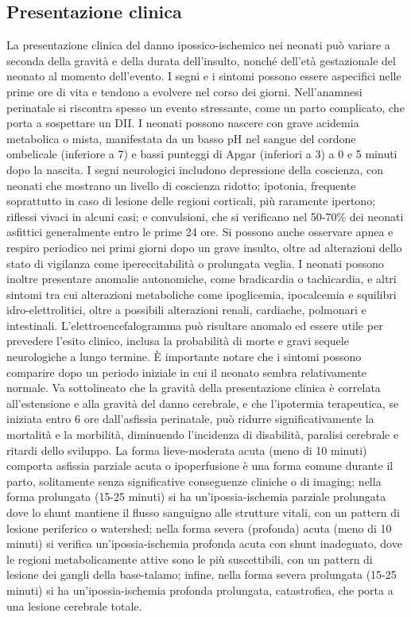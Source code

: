 \subsection{Presentazione clinica}
La presentazione clinica del danno ipossico-ischemico nei neonati può variare a seconda della gravità e della durata dell'insulto, nonché dell'età gestazionale del neonato al momento dell'evento. I segni e i sintomi possono essere aspecifici nelle prime ore di vita e tendono a evolvere nel corso dei giorni.
Nell'anamnesi perinatale si riscontra spesso un evento stressante, come un parto complicato, che porta a sospettare un DII. I neonati possono nascere con grave acidemia metabolica o mista, manifestata da un basso pH nel sangue del cordone ombelicale (inferiore a 7) e bassi punteggi di Apgar (inferiori a 3) a 0 e 5 minuti dopo la nascita. I segni neurologici includono depressione della coscienza, con neonati che mostrano un livello di coscienza ridotto; ipotonia, frequente soprattutto in caso di lesione delle regioni corticali, più raramente ipertono; riflessi vivaci in alcuni casi; e convulsioni, che si verificano nel 50-70\% dei neonati asfittici generalmente entro le prime 24 ore. Si possono anche osservare apnea e respiro periodico nei primi giorni dopo un grave insulto, oltre ad alterazioni dello stato di vigilanza come ipereccitabilità o prolungata veglia. 
I neonati possono inoltre presentare anomalie autonomiche, come bradicardia o tachicardia, e altri sintomi tra cui alterazioni metaboliche come ipoglicemia, ipocalcemia e squilibri idro-elettrolitici, oltre a possibili alterazioni renali, cardiache, polmonari e intestinali. L'elettroencefalogramma può risultare anomalo ed essere utile per prevedere l'esito clinico, inclusa la probabilità di morte e gravi sequele neurologiche a lungo termine. È importante notare che i sintomi possono comparire dopo un periodo iniziale in cui il neonato sembra relativamente normale. 
Va sottolineato che la gravità della presentazione clinica è correlata all'estensione e alla gravità del danno cerebrale, e che l'ipotermia terapeutica, se iniziata entro 6 ore dall'asfissia perinatale, può ridurre significativamente la mortalità e la morbilità, diminuendo l'incidenza di disabilità, paralisi cerebrale e ritardi dello sviluppo.
La forma lieve-moderata acuta (meno di 10 minuti) comporta asfissia parziale acuta o ipoperfusione è una forma comune durante il parto, solitamente senza significative conseguenze cliniche o di imaging; nella forma prolungata (15-25 minuti) si ha un'ipossia-ischemia parziale prolungata dove lo shunt mantiene il flusso sanguigno alle strutture vitali, con un pattern di lesione periferico o watershed; nella forma severa (profonda) acuta (meno di 10 minuti) si verifica un'ipossia-ischemia profonda acuta con shunt inadeguato, dove le regioni metabolicamente attive sono le più suscettibili, con un pattern di lesione dei gangli della base-talamo; infine, nella forma severa prolungata (15-25 minuti) si ha un'ipossia-ischemia profonda prolungata, catastrofica, che porta a una lesione cerebrale totale.

